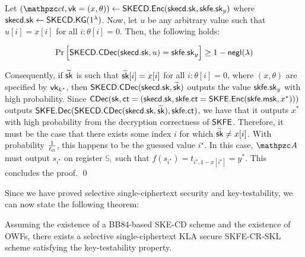 Let $(\qct, \vk = (x, \theta)) \gets \SKECD.\Enc(\skecd.\sk,
\skfe.\sk_y)$
where $\mathsf{skecd}.\mathsf{sk} \leftarrow \mathsf{SKECD}.\mathsf{KG}(1^\lambda)$. Now, let $u$ be any
arbitrary value such that $u[i] = x[i]$ for all $i : \theta[i] = 0$.
Then, the following holds:

$$\Pr\Big[\mathsf{SKECD}.\mathsf{CDec}(\mathsf{skecd}.\mathsf{sk}, u) = \mathsf{skfe}.\mathsf{sk}_y\Big] \ge 1 -
{\mathsf{negl}}(\lambda)$$

Consequently, if $\widetilde{\mathsf{sk}}$ is such that $\widetilde{\mathsf{sk}}[i]
= x[i]$ for all $i: \theta[i] = 0$, where $(x, \theta)$ are
specified by $\mathsf{vk}_{k^\star}$, then $\mathsf{SKECD}.\mathsf{CDec}(\mathsf{skecd}.\mathsf{sk},
\widetilde{\mathsf{sk}})$ outputs the value $\mathsf{skfe}.\mathsf{sk}_y$ with high
probability. Since $\mathsf{CDec}(\mathsf{sk}, \mathsf{ct} = (\mathsf{skecd}.\mathsf{sk}, \mathsf{skfe}.\mathsf{ct} =
\mathsf{SKFE}.\mathsf{Enc}\allowbreak(\mathsf{skfe}.\mathsf{msk}, x^*)))$ outputs
$\mathsf{SKFE}.\mathsf{Dec}(\mathsf{SKECD}.\mathsf{CDec}(\mathsf{skecd}.\mathsf{sk}, \widetilde{\mathsf{sk}}), \mathsf{skfe}.\mathsf{ct})$, we
have that it outputs $x^*$ with high probability from the decryption
correctness of $\mathsf{SKFE}$. Therefore, it must be the case that there
exists some index $i$ for which $\widetilde{\mathsf{sk}} \neq x[i]$. With
probability $\frac{1}{\ell_{\mathsf{ct}}}$, this happens to be the guessed value
$i^\star$.  In this case, $\qA$ must output $s_{i^\star}$ on register
$\qreg{S_i}$ such that $f(s_{i^\star}) = t_{i^\star, 1 - x[i^\star]} =
y^*$. This concludes the proof. \qed

Since we have proved selective single-ciphertext security and
key-testability, we can now state the following theorem:

\begin{theorem}
Assuming the existence of a BB84-based SKE-CD scheme and the existence
of OWFs, there exists a selective single-ciphertext KLA secure
SKFE-CR-SKL scheme satisfying the key-testability property.
\end{theorem}




